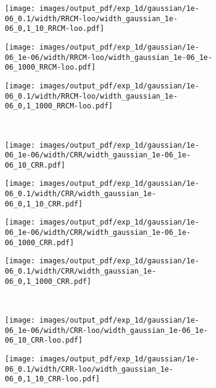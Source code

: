 \documentclass[a4paper,14pt]{extarticle}
\begin{document}
\begin{figure}
\begin{subfigure}[b]{0.25\linewidth}
  \end{subfigure}%
  \begin{subfigure}[b]{0.25\linewidth}
    \texttt{[image: images/output\_pdf/exp\_1d/gaussian/1e-06\_0.1/width/RRCM-loo/width\_gaussian\_1e-06\_0,1\_10\_RRCM-loo.pdf]}
  \end{subfigure}%
  \begin{subfigure}[b]{0.25\linewidth}
    \texttt{[image: images/output\_pdf/exp\_1d/gaussian/1e-06\_1e-06/width/RRCM-loo/width\_gaussian\_1e-06\_1e-06\_1000\_RRCM-loo.pdf]}
  \end{subfigure}%
  \begin{subfigure}[b]{0.25\linewidth}
    \texttt{[image: images/output\_pdf/exp\_1d/gaussian/1e-06\_0.1/width/RRCM-loo/width\_gaussian\_1e-06\_0,1\_1000\_RRCM-loo.pdf]}
  \end{subfigure}\\
  \begin{subfigure}[b]{0.25\linewidth}
    \texttt{[image: images/output\_pdf/exp\_1d/gaussian/1e-06\_1e-06/width/CRR/width\_gaussian\_1e-06\_1e-06\_10\_CRR.pdf]}
  \end{subfigure}%
  \begin{subfigure}[b]{0.25\linewidth}
    \texttt{[image: images/output\_pdf/exp\_1d/gaussian/1e-06\_0.1/width/CRR/width\_gaussian\_1e-06\_0,1\_10\_CRR.pdf]}
  \end{subfigure}%
  \begin{subfigure}[b]{0.25\linewidth}
    \texttt{[image: images/output\_pdf/exp\_1d/gaussian/1e-06\_1e-06/width/CRR/width\_gaussian\_1e-06\_1e-06\_1000\_CRR.pdf]}
  \end{subfigure}%
  \begin{subfigure}[b]{0.25\linewidth}
    \texttt{[image: images/output\_pdf/exp\_1d/gaussian/1e-06\_0.1/width/CRR/width\_gaussian\_1e-06\_0,1\_1000\_CRR.pdf]}
  \end{subfigure}\\
  \begin{subfigure}[b]{0.25\linewidth}
    \texttt{[image: images/output\_pdf/exp\_1d/gaussian/1e-06\_1e-06/width/CRR-loo/width\_gaussian\_1e-06\_1e-06\_10\_CRR-loo.pdf]}
    \caption{} \label{fig:gaussian_1d_low_noise_width_arb_c1}
  \end{subfigure}%
  \begin{subfigure}[b]{0.25\linewidth}
    \texttt{[image: images/output\_pdf/exp\_1d/gaussian/1e-06\_0.1/width/CRR-loo/width\_gaussian\_1e-06\_0,1\_10\_CRR-loo.pdf]}

\end{subfigure}
\end{figure}
\end{document}
